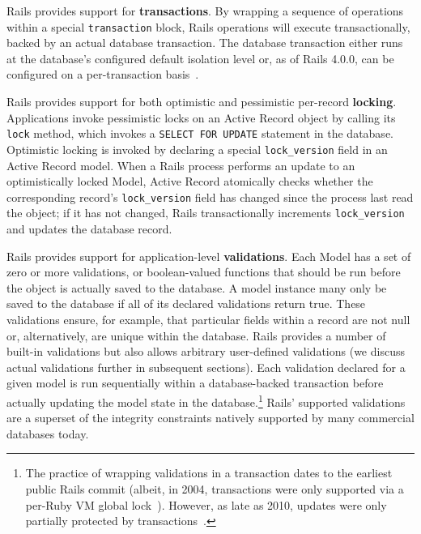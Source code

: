 \begin{myenumerate}
\item Rails provides support for \textbf{transactions}. By wrapping a
sequence of operations within a special \texttt{transaction} block,
Rails operations will execute transactionally, backed by an actual
database transaction. The database transaction either runs at the
database's configured default isolation level or, as of Rails 4.0.0, can
be configured on a per-transaction
basis~\cite{code-transaction-isolation}.

\item Rails provides support for both optimistic and pessimistic
  per-record \textbf{locking}. Applications invoke pessimistic locks
  on an Active Record object by calling its \texttt{lock} method,
  which invokes a \texttt{SELECT FOR UPDATE} statement in the
  database. Optimistic locking is invoked by declaring a special
  \texttt{lock\_version} field in an Active Record model. When a Rails
  process performs an update to an optimistically locked Model, Active
  Record atomically checks whether the corresponding record's
  \texttt{lock\_version} field has changed since the process last read
  the object; if it has not changed, Rails transactionally increments
  \texttt{lock\_version} and updates the database record.

\item Rails provides support for application-level
  \textbf{validations}. Each Model has a set of zero or more
  validations, or boolean-valued functions that should be run before
  the object is actually saved to the database. A model instance many
  only be saved to the database if all of its declared validations
  return true. These validations ensure, for example, that particular
  fields within a record are not null or, alternatively, are unique
  within the database. Rails provides a number of built-in validations
  but also allows arbitrary user-defined validations (we discuss
  actual validations further in subsequent sections). Each validation
  declared for a given model is run sequentially within a
  database-backed transaction before actually updating the model state
  in the database.\footnote{The practice of wrapping validations in
    a transaction dates to the earliest public Rails commit (albeit,
    in 2004, transactions were only supported via a per-Ruby VM global
    lock~\cite{code-txn-lock}). However, as late as 2010, updates were
    only partially protected by
    transactions~\cite{code-txn-update}.} Rails' supported
  validations are a superset of the integrity constraints natively
  supported by many commercial databases today.\\[-2mm] 


\end{myenumerate}
